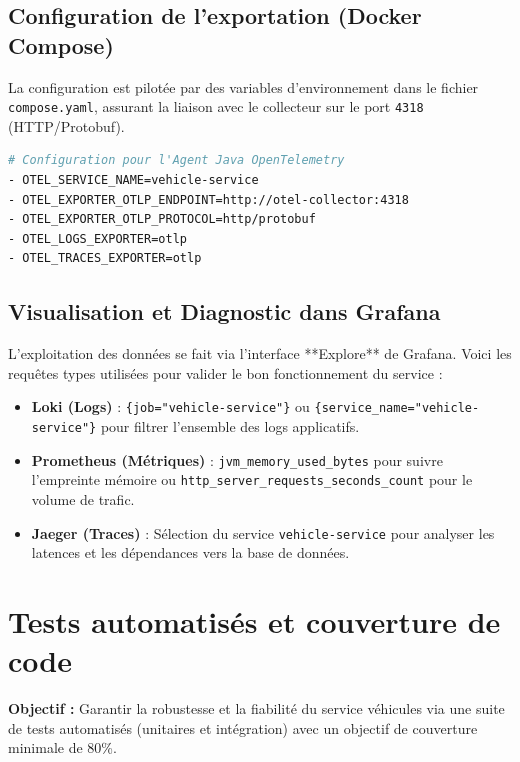 \documentclass[12pt,a4paper]{article}
\begin{document}
\subsection{Configuration de l'exportation (Docker Compose)}

La configuration est pilotée par des variables d'environnement dans le fichier \texttt{compose.yaml}, assurant la liaison avec le collecteur sur le port \texttt{4318} (HTTP/Protobuf).

\begin{lstlisting}[language=bash, caption=Variables d'environnement pour l'Agent Java]
# Configuration pour l'Agent Java OpenTelemetry
- OTEL_SERVICE_NAME=vehicle-service
- OTEL_EXPORTER_OTLP_ENDPOINT=http://otel-collector:4318
- OTEL_EXPORTER_OTLP_PROTOCOL=http/protobuf
- OTEL_LOGS_EXPORTER=otlp
- OTEL_TRACES_EXPORTER=otlp
\end{lstlisting}

\subsection{Visualisation et Diagnostic dans Grafana}

L'exploitation des données se fait via l'interface **Explore** de Grafana. Voici les requêtes types utilisées pour valider le bon fonctionnement du service :

\begin{itemize}
    \item \textbf{Loki (Logs)} : \texttt{\{job="vehicle-service"\}} ou \texttt{\{service\_name="vehicle-service"\}} pour filtrer l'ensemble des logs applicatifs.
    \item \textbf{Prometheus (Métriques)} : \texttt{jvm\_memory\_used\_bytes} pour suivre l'empreinte mémoire ou \texttt{http\_server\_requests\_seconds\_count} pour le volume de trafic.
    \item \textbf{Jaeger (Traces)} : Sélection du service \texttt{vehicle-service} pour analyser les latences et les dépendances vers la base de données.
\end{itemize}

\newpage
\section{Tests automatisés et couverture de code}

\begin{infobox}
\textbf{Objectif :} Garantir la robustesse et la fiabilité du service véhicules via une suite de tests automatisés (unitaires et intégration) avec un objectif de couverture minimale de 80\%.
\end{infobox}
\end{document}

